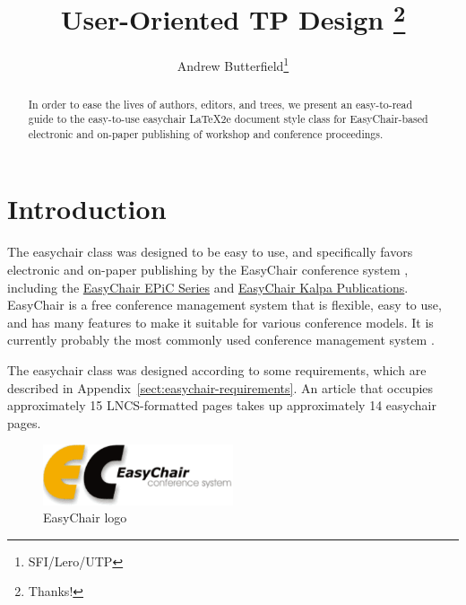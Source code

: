 \documentclass[EPiC]{easychair}
\title{User-Oriented TP Design%
\thanks{Thanks!}}
\author{
Andrew Butterfield\inst{1}\thanks{SFI/Lero/UTP}
}
\institute{
  Trinity College Dublin,
  Ireland\\
  \email{butrfeld@scss.tcd.ie}
 }
\newcommand{\easychair}{\textsf{easychair}}
\begin{document}
\maketitle

\begin{abstract}
  In order to ease the lives of authors, editors, and trees, we present an
  easy-to-read guide to the easy-to-use {\easychair} {\LaTeX2e} document style
  class for EasyChair-based electronic and on-paper publishing of workshop and conference
  proceedings.
\end{abstract}


\setcounter{tocdepth}{2}
{\small
\tableofcontents}

%
%

\section{Introduction}
\label{sect:introduction}

The {\easychair} class was designed to be easy to use, and specifically favors
electronic and on-paper publishing by the EasyChair conference system
\cite{easychair}, including the
\href{http://www.easychair.org/publications/EPiC}{EasyChair EPiC
  Series} and \href{http://www.easychair.org/publications/Kalpa}{EasyChair Kalpa
  Publications}. 
EasyChair is a free conference management system that is flexible, easy to use,
and has many features to make it suitable for various conference models. It is
currently probably the most commonly used conference management system
\cite{easychair}.  

The {\easychair} class was designed according to some requirements, which
are described in Appendix~\ref{sect:easychair-requirements}. 
An article that occupies approximately 15 LNCS-formatted pages
takes up approximately 14 {\easychair} pages.

\begin{figure}[tb]
	\begin{centering}
	\includegraphics[width=0.5\textwidth]{logoEC}
	\caption{EasyChair logo}
	\label{fig:easychair-logo}
	\end{centering}
\end{figure}
\end{document}
